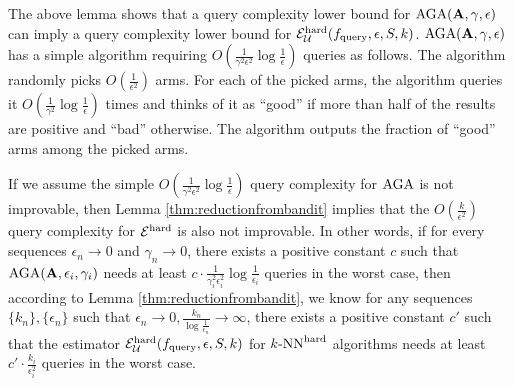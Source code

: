 The above lemma shows that a query complexity lower bound for ${\mathrm{AGA}}(\mathbf A, \gamma,\epsilon)$ can imply a query complexity lower bound for $\mathcal{E}^{\mathrm{hard}}_{{\mathcal{U}}}(f_{\mathrm{query}},\epsilon,S,k)$. ${\mathrm{AGA}}(\mathbf A, \gamma,\epsilon)$ has a simple algorithm requiring $O(\frac{1}{\gamma^2\epsilon^2}\log\frac{1}{\epsilon})$ queries as follows. The algorithm randomly picks $O(\frac{1}{\epsilon^2})$ arms. For each of the picked arms, the algorithm queries it $O(\frac{1}{\gamma^2}\log\frac{1}{\epsilon})$ times and thinks of it as ``good'' if more than half of the results are positive and ``bad'' otherwise. The algorithm outputs the fraction of ``good'' arms among the picked arms.

If we assume the simple $O(\frac{1}{\gamma^2\epsilon^2}\log\frac{1}{\epsilon})$ query complexity for ${\mathrm{AGA}}$ is not improvable, then Lemma \ref{thm:reductionfrombandit} implies that the $O(\frac{k}{\epsilon^2})$ query complexity for $\mathcal{E}^{\mathrm{hard}}$ is also not improvable. In other words, if for every sequences $\epsilon_n\rightarrow 0$ and $\gamma_n\rightarrow 0$, there exists a positive constant $c$ such that ${\mathrm{AGA}}(\mathbf A,\epsilon_i,\gamma_i)$ needs at least $c\cdot \frac{1}{\gamma_i^2\epsilon_i^2}\log\frac{1}{\epsilon_i}$ queries in the worst case, then according to Lemma \ref{thm:reductionfrombandit}, we know for any sequences $\{k_n\},\{\epsilon_n\}$ such that $\epsilon_n\rightarrow 0,\frac{k_n}{\log\frac{1}{\epsilon_n}}\rightarrow\infty$, there exists a positive constant $c'$ such that the estimator $\mathcal{E}^{\mathrm{hard}}_{{\mathcal{U}}}(f_{\mathrm{query}},\epsilon,S,k)$ for ${\text{$k$-NN}^{\mathrm{hard}}}$ algorithms needs at least $c'\cdot\frac{k_i}{\epsilon_i^2}$ queries in the worst case.

